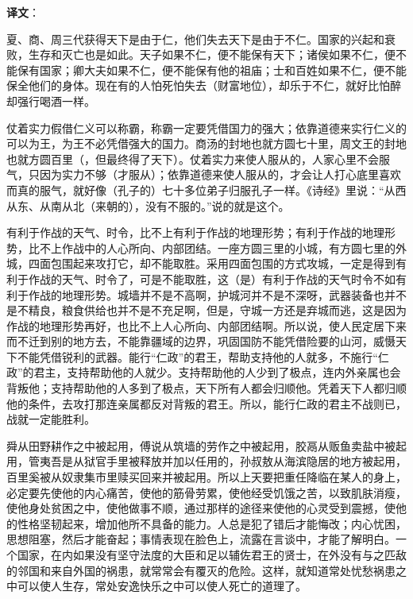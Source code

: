 \documentclass[12pt,UTF-8,openany]{ctexbook}
\begin{document}
\newpage

\textbf{译文}：

\vspace{1em}

\begin{normalsize}
    
    夏、商、周三代获得天下是由于仁，他们失去天下是由于不仁。国家的兴起和衰败，生存和灭亡也是如此。天子如果不仁，便不能保有天下；诸侯如果不仁，便不能保有国家；卿大夫如果不仁，便不能保有他的祖庙；士和百姓如果不仁，便不能保全他们的身体。现在有的人怕死怕失去（财富地位），却乐于不仁，就好比怕醉却强行喝酒一样。
    
    仗着实力假借仁义可以称霸，称霸一定要凭借国力的强大；依靠道德来实行仁义的可以为王，为王不必凭借强大的国力。商汤的封地也就方圆七十里，周文王的封地也就方圆百里（，但最终得了天下）。仗着实力来使人服从的，人家心里不会服气，只因为实力不够（才服从）；依靠道德来使人服从的，才会让人打心底里喜欢而真的服气，就好像（孔子的）七十多位弟子归服孔子一样。《诗经》里说：“从西从东、从南从北（来朝的），没有不服的。”说的就是这个。
    
    有利于作战的天气、时令，比不上有利于作战的地理形势；有利于作战的地理形势，比不上作战中的人心所向、内部团结。一座方圆三里的小城，有方圆七里的外城，四面包围起来攻打它，却不能取胜。采用四面包围的方式攻城，一定是得到有利于作战的天气、时令了，可是不能取胜，这（是）有利于作战的天气时令不如有利于作战的地理形势。城墙并不是不高啊，护城河并不是不深呀，武器装备也并不是不精良，粮食供给也并不是不充足啊，但是，守城一方还是弃城而逃，这是因为作战的地理形势再好，也比不上人心所向、内部团结啊。所以说，使人民定居下来而不迁到别的地方去，不能靠疆域的边界，巩固国防不能凭借险要的山河，威慑天下不能凭借锐利的武器。能行“仁政”的君王，帮助支持他的人就多，不施行“仁政”的君主，支持帮助他的人就少。支持帮助他的人少到了极点，连内外亲属也会背叛他；支持帮助他的人多到了极点，天下所有人都会归顺他。凭着天下人都归顺他的条件，去攻打那连亲属都反对背叛的君王。所以，能行仁政的君主不战则已，战就一定能胜利。
    
    舜从田野耕作之中被起用，傅说从筑墙的劳作之中被起用，胶鬲从贩鱼卖盐中被起用，管夷吾是从狱官手里被释放并加以任用的，孙叔敖从海滨隐居的地方被起用，百里奚被从奴隶集市里赎买回来并被起用。所以上天要把重任降临在某人的身上，必定要先使他的内心痛苦，使他的筋骨劳累，使他经受饥饿之苦，以致肌肤消瘦，使他身处贫困之中，使他做事不顺，通过那样的途径来使他的心灵受到震撼，使他的性格坚韧起来，增加他所不具备的能力。人总是犯了错后才能悔改；内心忧困，思想阻塞，然后才能奋起；事情表现在脸色上，流露在言谈中，才能了解明白。一个国家，在内如果没有坚守法度的大臣和足以辅佐君王的贤士，在外没有与之匹敌的邻国和来自外国的祸患，就常常会有覆灭的危险。这样，就知道常处忧愁祸患之中可以使人生存，常处安逸快乐之中可以使人死亡的道理了。
    

\end{normalsize}
\end{document}
